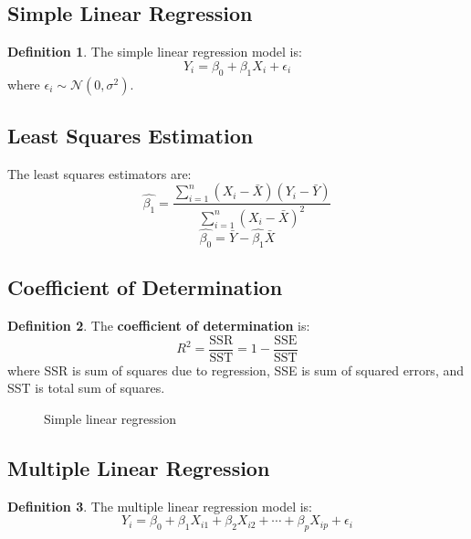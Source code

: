 \documentclass[11pt]{article}
\theoremstyle{definition}
\newtheorem{definition}{Definition}[section]
\begin{document}
\subsection{Simple Linear Regression}
\begin{definition}
The simple linear regression model is:
$$Y_i = \beta_0 + \beta_1 X_i + \epsilon_i$$
where $\epsilon_i \sim \mathcal{N}(0, \sigma^2)$.
\end{definition}

\subsection{Least Squares Estimation}
The least squares estimators are:
$$\hat{\beta_1} = \frac{\sum_{i=1}^n (X_i - \bar{X})(Y_i - \bar{Y})}{\sum_{i=1}^n (X_i - \bar{X})^2}$$
$$\hat{\beta_0} = \bar{Y} - \hat{\beta_1}\bar{X}$$

\subsection{Coefficient of Determination}
\begin{definition}
The \textbf{coefficient of determination} is:
$$R^2 = \frac{\text{SSR}}{\text{SST}} = 1 - \frac{\text{SSE}}{\text{SST}}$$
where SSR is sum of squares due to regression, SSE is sum of squared errors, and SST is total sum of squares.
\end{definition}

\begin{figure}[h]
\centering
{}
\caption{Simple linear regression}
\end{figure}

\subsection{Multiple Linear Regression}
\begin{definition}
The multiple linear regression model is:
$$Y_i = \beta_0 + \beta_1 X_{i1} + \beta_2 X_{i2} + \cdots + \beta_p X_{ip} + \epsilon_i$$
\end{definition}
\end{document}
